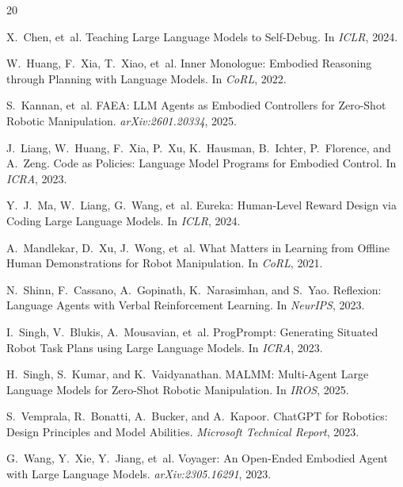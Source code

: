 \documentclass[11pt]{article}
\begin{document}
\begin{thebibliography}{20}

X.~Chen, et~al.
\newblock Teaching Large Language Models to Self-Debug.
\newblock In \emph{ICLR}, 2024.

W.~Huang, F.~Xia, T.~Xiao, et~al.
\newblock Inner Monologue: Embodied Reasoning through Planning with Language Models.
\newblock In \emph{CoRL}, 2022.

S.~Kannan, et~al.
\newblock FAEA: LLM Agents as Embodied Controllers for Zero-Shot Robotic Manipulation.
\newblock \emph{arXiv:2601.20334}, 2025.

J.~Liang, W.~Huang, F.~Xia, P.~Xu, K.~Hausman, B.~Ichter, P.~Florence, and A.~Zeng.
\newblock Code as Policies: Language Model Programs for Embodied Control.
\newblock In \emph{ICRA}, 2023.

Y.~J.~Ma, W.~Liang, G.~Wang, et~al.
\newblock Eureka: Human-Level Reward Design via Coding Large Language Models.
\newblock In \emph{ICLR}, 2024.

A.~Mandlekar, D.~Xu, J.~Wong, et~al.
\newblock What Matters in Learning from Offline Human Demonstrations for Robot Manipulation.
\newblock In \emph{CoRL}, 2021.

N.~Shinn, F.~Cassano, A.~Gopinath, K.~Narasimhan, and S.~Yao.
\newblock Reflexion: Language Agents with Verbal Reinforcement Learning.
\newblock In \emph{NeurIPS}, 2023.

I.~Singh, V.~Blukis, A.~Mousavian, et~al.
\newblock ProgPrompt: Generating Situated Robot Task Plans using Large Language Models.
\newblock In \emph{ICRA}, 2023.

H.~Singh, S.~Kumar, and K.~Vaidyanathan.
\newblock MALMM: Multi-Agent Large Language Models for Zero-Shot Robotic Manipulation.
\newblock In \emph{IROS}, 2025.

S.~Vemprala, R.~Bonatti, A.~Bucker, and A.~Kapoor.
\newblock ChatGPT for Robotics: Design Principles and Model Abilities.
\newblock \emph{Microsoft Technical Report}, 2023.

G.~Wang, Y.~Xie, Y.~Jiang, et~al.
\newblock Voyager: An Open-Ended Embodied Agent with Large Language Models.
\newblock \emph{arXiv:2305.16291}, 2023.


\end{thebibliography}
\end{document}
